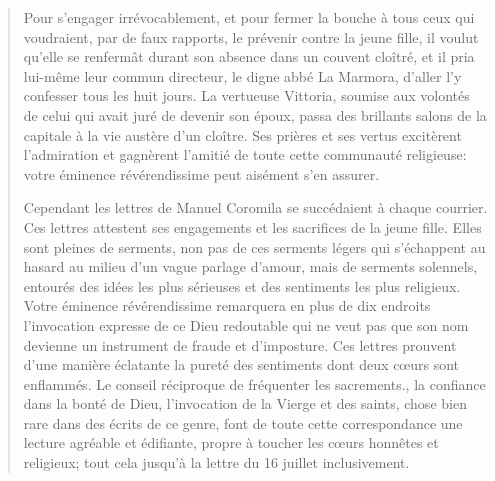 \begin{quote}
Pour s'engager irrévocablement, et pour fermer la bouche à tous ceux qui voudraient, par de faux rapports, le prévenir contre la jeune fille, il voulut qu'elle se renfermât durant son absence dans un couvent cloîtré, et il pria lui-même leur commun directeur, le digne abbé La Marmora, d'aller l'y confesser tous les huit jours. La vertueuse Vittoria, soumise aux volontés de celui qui avait juré de devenir son époux, passa des brillants salons de la capitale à la vie austère d'un cloître. Ses prières et ses vertus excitèrent l'admiration et gagnèrent l'amitié de toute cette communauté religieuse: votre éminence révérendissime peut aisément s'en assurer.

Cependant les lettres de Manuel Coromila se succédaient à chaque courrier. Ces lettres attestent ses engagements et les sacrifices de la jeune fille. Elles sont pleines de serments, non pas de ces serments légers qui s'échappent au hasard au milieu d'un vague parlage d'amour, mais de serments solennels, entourés des idées les plus sérieuses et des sentiments les plus religieux. Votre éminence révérendissime remarquera en plus de dix endroits l'invocation expresse de ce Dieu redoutable qui ne veut pas que son nom devienne un instrument de fraude et d'imposture. Ces lettres prouvent d'une manière éclatante la pureté des sentiments dont deux c\oe{}urs sont enflammés. Le conseil réciproque de fréquenter les sacrements., la confiance dans la bonté de Dieu, l'invocation de la Vierge et des saints, chose bien rare dans des écrits de ce genre, font de toute cette correspondance une lecture agréable et édifiante, propre à toucher les c\oe{}urs honnêtes et religieux; \textendash{} tout cela jusqu'à la lettre du 16 juillet inclusivement.


\end{quote}

